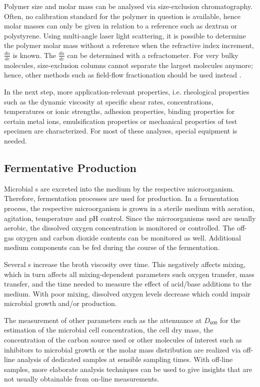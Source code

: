 Polymer size and molar mass can be analysed via size-exclusion chromatography. Often, no calibration standard for the polymer in question is available, hence molar masses can only be given in relation to a reference such as dextran or polystyrene. Using multi-angle laser light scattering, it is possible to determine the polymer molar mass without a reference when the refractive index increment, $\frac{dn}{dc}$ is known. The $\frac{dn}{dc}$ can be determined with a refractometer. For very bulky molecules, size-exclusion columns cannot separate the largest molecules anymore; hence, other methods such as field-flow fractionation should be used instead \cite{Arndt1996}.

In the next step, more application-relevant properties, i.e. rheological properties such as the dynamic viscosity at specific shear rates, concentrations, temperatures or ionic strengths, adhesion properties, binding properties for certain metal ions, emulsification properties or mechanical properties of test specimen are characterized. For most of these analyses, special equipment is needed.

\subsection{Fermentative \EPS{} Production\label{subsec-intro-eps-production}}
Microbial \eps{}s are excreted into the medium by the respective microorganism. Therefore, fermentation processes are used for \eps{} production. In a fermentation process, the respective microorganism is grown in a sterile medium with aeration, agitation, temperature and pH control. Since the microorganisms used are usually aerobic, the dissolved oxygen concentration is monitored or controlled. The off-gas oxygen and carbon dioxide contents can be monitored as well. Additional medium components can be fed during the course of the fermentation.

Several \eps{}s increase the broth viscosity over time. This negatively affects mixing, which in turn affects all mixing-dependent parameters such oxygen transfer, mass transfer, and the time needed to measure the effect of acid/base additions to the medium. With poor mixing, dissolved oxygen levels decrease which could impair microbial growth and/or production.

The measurement of other parameters such as the attenuance at  $D_{600}$ for the estimation of the microbial cell concentration, the cell dry mass, the concentration of the carbon source used or other molecules of interest such as inhibitors to microbial growth or the molar mass distribution are realized via off-line analysis of dedicated samples at sensible sampling times. With off-line samples, more elaborate analysis techniques can be used to give insights that are not usually obtainable from on-line measurements.

